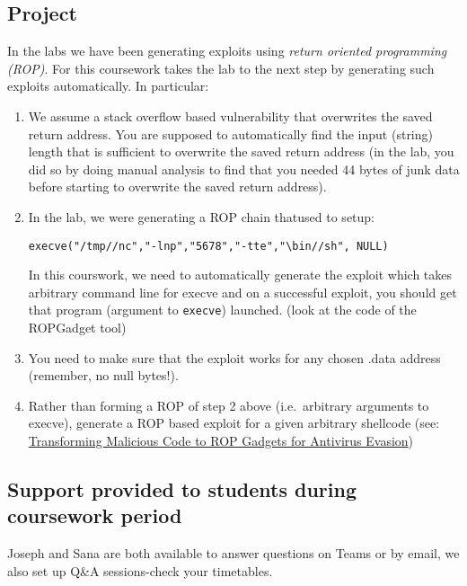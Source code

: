 \documentclass{article}
\begin{document}
\subsection*{Project}

In the labs we have been generating exploits using \emph{return oriented programming (ROP)}. For this coursework
takes the lab to the next step by generating such exploits
automatically. In particular:

\begin{enumerate}
\item We assume a stack overflow based vulnerability that overwrites the
  saved return address. You are supposed to automatically find the input
  (string) length that is sufficient to overwrite the saved return address (in the
  lab, you did so by doing manual analysis to find that you needed 44
  bytes of junk data before starting to overwrite the saved return address).

\item In the lab, we were generating a ROP chain thatused to setup:

  \texttt{execve("/tmp//nc","-lnp","5678","-tte","\textbackslash bin//sh",
    NULL)}

  In this courswork, we need to automatically generate the exploit
  which takes arbitrary command line for execve and on a successful
  exploit, you should get that program (argument to \texttt{execve})
  launched. (look at the code of the ROPGadget tool)

\item You need to make sure that the exploit works for any chosen .data
  address (remember, no null bytes!).

\item Rather than forming a ROP of step 2 above (i.e.~arbitrary arguments
  to execve), generate a ROP based exploit for a given arbitrary shellcode
  (see: 
  \href{https://ietresearch.onlinelibrary.wiley.com/doi/epdf/10.1049/iet-ifs.2018.5386}{Transforming Malicious Code to ROP Gadgets for Antivirus
    Evasion})
\end{enumerate}

\subsection*{Support provided to students during coursework period}

Joseph and Sana are both available to answer questions on Teams or by
email, we also set up Q\&A sessions-check your timetables.
\end{document}
